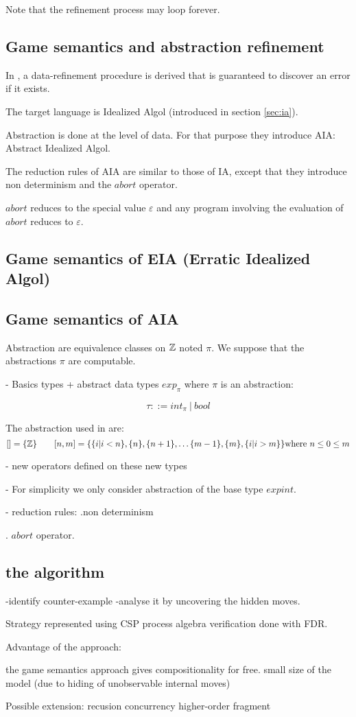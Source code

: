 Note that the refinement process may loop forever.


\subsection{Game semantics and abstraction refinement}
In \citep{DBLP:conf/sas/DimovskiGL05}, a data-refinement procedure
is derived that is guaranteed to discover an error if it exists.

The target language is Idealized Algol (introduced in section
\ref{sec:ia}).

Abstraction is done at the level of data. For that purpose they
introduce AIA: Abstract Idealized Algol.

The reduction rules of AIA are similar to those of IA, except that
they introduce non determinism and the $abort$ operator.

$abort$ reduces to the special value $\varepsilon$ and any program
involving the evaluation of $abort$ reduces to $\varepsilon$.


\subsection{Game semantics of EIA (Erratic Idealized Algol)}

\subsection{Game semantics of AIA}
Abstraction are equivalence classes on $\mathbb{Z}$ noted $\pi$. We
suppose that the abstractions $\pi$ are computable.

- Basics types + abstract data types $exp_\pi$ where $\pi$ is an
abstraction:

$$ \tau ::= int_\pi\ |\ bool$$

The abstraction used in \cite{DBLP:conf/sas/DimovskiGL05} are:
$$ [] = \{ \mathbb{Z} \} \qquad [n,m] = \{ \{ i | i<n \}, \{ n \}, \{n+1\},
\ldots \{ m-1\}, \{ m\}, \{ i | i > m \} \} \mbox{where } n \leq 0
\leq m$$


- new operators defined on these new types

- For simplicity we only consider abstraction of the base type
$expint$.

- reduction rules:
.non determinism

. $abort$ operator.






\subsection{the algorithm}
-identify counter-example
-analyse it by uncovering the hidden moves.

Strategy represented using CSP process algebra verification done
with FDR.



Advantage of the approach:

the game semantics approach gives compositionality for free. small
size of the model (due to hiding of unobservable internal moves)



Possible extension:
recusion
concurrency
higher-order fragment
